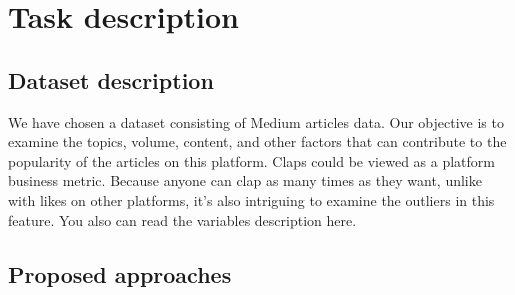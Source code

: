 \documentclass[12pt]{report}
\begin{document}

\boldmath
\pagestyle{fancy}
\tableofcontents
\newpage
{}


\section{Task description}
\subsection*{Dataset description}
We have chosen a dataset consisting of Medium articles data. Our objective is to examine the topics, volume, content, and other factors that can contribute to the popularity of the articles on this platform. 
Claps could be viewed as a platform business metric. Because anyone can clap as many times as they want, unlike with likes on other platforms, it's also intriguing to examine the outliers in this feature.
You also can read the variables description here.

\subsection*{Proposed approaches}
\end{document}
